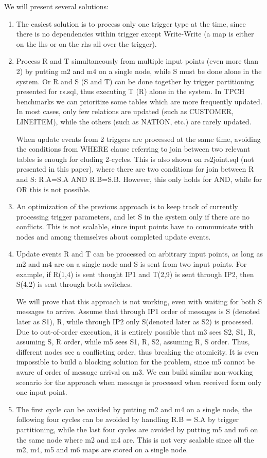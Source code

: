 \documentclass{sig-semester}
\begin{document}
We will present several solutions:
\begin{enumerate}
\item The easiest solution is to process only one trigger type at the time, since there is no dependencies within trigger except Write-Write (a map is either on the lhs or on the rhs all over the trigger).
\item Process R and T simultaneously from multiple input points (even more than 2) by putting m2 and m4 on a single node, while S must be done alone in the system. Or R and S (S and T) can be done together by trigger partitioning presented for rs.sql, thus executing T (R) alone in the system. In TPCH benchmarks we can prioritize some tables which are more frequently updated. In most cases, only few relations are updated (such as CUSTOMER, LINEITEM), while the others (such as NATION, etc.) are rarely updated.

When update events from 2 triggers are processed at the same time, avoiding the conditions from WHERE clause referring to join between two relevant tables is enough for eluding 2-cycles. This is also shown on rs2joint.sql (not presented in this paper), where there are two conditions for join between R and S: R.A=S.A AND R.B=S.B. However, this only holds for AND, while for OR this is not possible.

\item An optimization of the previous approach is to keep track of currently processing trigger parameters, and let S in the system only if there are no conflicts. This is not scalable, since input points have to communicate with nodes and among themselves about completed update events.
\item Update events R and T can be processed on arbitrary input points, as long as m2 and m4 are on a single node and S is sent from two input points. For example, if R(1,4) is sent thought IP1 and T(2,9) is sent through IP2, then S(4,2) is sent through both switches.

We will prove that this approach is not working, even with waiting for both S messages to arrive. Assume that through IP1 order of messages is S (denoted later as S1), R, while through IP2 only S(denoted later as S2) is processed. Due to out-of-order execution, it is entirely possible that m3 sees S2, S1, R, assuming S, R order, while m5 sees S1, R, S2, assuming R, S order. Thus, different nodes see a conflicting order, thus breaking the atomicity. It is even impossible to build a blocking solution for the problem, since m5 cannot be aware of order of message arrival on m3. We can build similar non-working scenario for the approach when message is processed when received form only one input point.

\item The first cycle can be avoided by putting m2 and m4 on a single node, the following four cycles can be avoided by handling R.B = S.A by trigger partitioning, while the last four cycles are avoided by putting m5 and m6 on the same node where m2 and m4 are. This is not very scalable since all the m2, m4, m5 and m6 maps are stored on a single node.
\end{enumerate}
\end{document}
